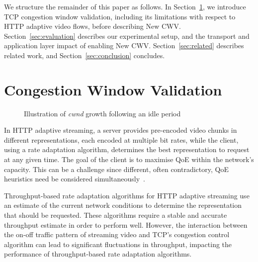 \documentclass[10pt,sigconf]{acmart}
\begin{document}
We structure the remainder of this paper as follows. In Section~\ref{sec:background}, we introduce TCP congestion window validation, including its limitations with respect to HTTP adaptive video flows, before describing New CWV. Section~\ref{sec:evaluation} describes our experimental setup, and the transport and application layer impact of enabling New CWV. Section~\ref{sec:related} describes related work, and Section~\ref{sec:conclusion} concludes.

\section{Congestion Window Validation}
\label{sec:background}

\begin{figure}
  \centering
    \caption{Illustration of \emph{cwnd} growth following an idle period}
    \label{fig:cwnd-growth-after-idle}
\end{figure}

In HTTP adaptive streaming, a server provides pre-encoded video chunks in different representations, each encoded at multiple bit rates, while the client, using a rate adaptation algorithm, determines the best representation to request at any given time. The goal of the client is to maximise QoE within the network's capacity. This can be a challenge since different, often contradictory, QoE heuristics need be considered simultaneously~\cite{Seufert-2015-A-Survey-on-QoE-Dash}. 

Throughput-based rate adaptation algorithms for HTTP adaptive streaming use an estimate of the current network conditions to determine the representation that should be requested. These algorithms require a stable and accurate throughput estimate in order to perform well. However, the interaction between the on-off traffic pattern of streaming video and TCP's congestion control algorithm can lead to significant fluctuations in throughput, impacting the performance of throughput-based rate adaptation algorithms.
\end{document}
